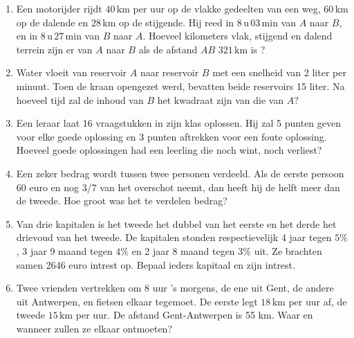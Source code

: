 \begin{enumerate}

\item Een motorijder rijdt $40\, \mathrm{km}$ per uur op de vlakke gedeelten van een weg,
$60 \, \mathrm{km}$ op de dalende en $28 \, \mathrm{km}$ op de stijgende.  Hij reed in $8\, \mathrm{u} \,03 \,\mathrm{min}$ van
$A$ naar $B$, en in $8\, \mathrm{u} \,27 \,\mathrm{min}$ van $B$ naar $A$. Hoeveel kilometers vlak,
stijgend en dalend terrein zijn er van $A$ naar $B$ als de afstand
$AB$ $321\, \mathrm{km}$ is ?

\item Water vloeit van reservoir $A$ naar reservoir $B$ met een snelheid van 2 liter per minuut. Toen de kraan
opengezet werd, bevatten beide reservoirs 15 liter. Na hoeveel tijd zal de inhoud van $B$ het kwadraat zijn van die van $A$?


\item Een leraar laat 16 vraagstukken in zijn klas oplossen. Hij zal 5 punten geven voor elke goede oplossing en 3 punten aftrekken voor een foute oplossing. Hoeveel goede oplossingen had een leerling die noch wint, noch verliest?

\item Een zeker bedrag wordt tussen twee personen verdeeld. Als de eerste persoon 60 euro en nog 3/7 van het overschot neemt, dan heeft hij de helft meer dan de tweede. Hoe groot was het te verdelen bedrag?

\item Van drie kapitalen is het tweede het dubbel van het eerste en het derde het
drievoud van het tweede. De kapitalen stonden respectievelijk 4 jaar tegen $5\%$, 3 jaar 9
maand tegen $4\%$ en 2 jaar 8 maand tegen $3\%$ uit. Ze brachten samen 2646 euro intrest op. Bepaal ieders kapitaal en zijn intrest.

\item Twee vrienden vertrekken om 8 uur 's morgens, de ene uit Gent, de andere uit Antwerpen, en fietsen elkaar tegemoet. De eerste legt $18\, \mathrm{km}$ per uur af, de tweede $15\, \mathrm{km}$ per uur. De afstand Gent-Antwerpen is 55 km. Waar en wanneer zullen ze elkaar ontmoeten?



\end{enumerate}
